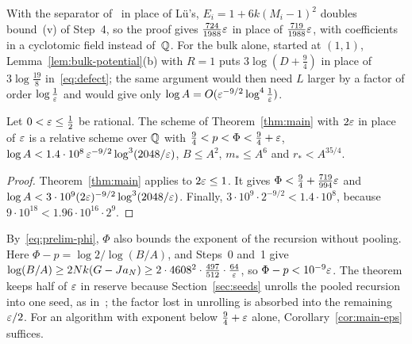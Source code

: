 With the separator of~\citep[Proposition~4.6]{FinCon26} in place of
Lü's, \(E_i=1+6k(M_i-1)^2\) doubles bound~(v) of Step~4, so the proof
gives \(\frac{724}{1988}\varepsilon\) in place of \(\frac{719}{1988}\varepsilon\),
with coefficients in a cyclotomic field instead of~\(\mathbb Q\). For the bulk
alone, started at \((1,1)\), Lemma~\ref{lem:bulk-potential}(b) with
\(R=1\) puts \(3\log(D+\frac94)\) in place of \(3\log\frac{19}8\)
in~\eqref{eq:defect}; the same argument would then need \(L\) larger by
a factor of order \(\log\frac1{\varepsilon}\) and would give only
\(\log A=O(\varepsilon^{-9/2}\log^4\frac1{\varepsilon})\).

\begin{corollary}\label{cor:main-eps}
Let \(0<\varepsilon\le\frac12\) be rational. The scheme of
Theorem~\ref{thm:main} with \(2\varepsilon\) in place of \(\varepsilon\) is a
relative scheme over \(\mathbb Q\) with \(\frac94<p<\Phi<\frac94+\varepsilon\),
\(\log A<1.4\cdot10^8\,\varepsilon^{-9/2}\log^3(2048/\varepsilon)\), \(B\le A^2\),
\(m_*\le A^6\) and \(r_*<A^{35/4}\).
\end{corollary}

\begin{proof}
Theorem~\ref{thm:main} applies to \(2\varepsilon\le1\). It gives
\(\Phi<\frac94+\frac{719}{994}\varepsilon\) and
\(\log A<3\cdot10^9(2\varepsilon)^{-9/2}\log^3(2048/\varepsilon)\). Finally,
\(3\cdot10^9\cdot2^{-9/2}<1.4\cdot10^8\), because
\(9\cdot10^{18}<1.96\cdot10^{16}\cdot2^9\).
\end{proof}

\begin{remark}
\label{rem:phi-p}
By~\eqref{eq:prelim-phi}, \(\Phi\) also bounds the exponent of the
recursion without pooling. Here \(\Phi-p=\log2/\log(B/A)\), and Steps~0
and~1 give
\(\log(B/A)\ge2Nk(G-Ja_N)\ge2\cdot4608^2\cdot\frac{497}{512}\cdot
\frac{64}{\varepsilon}\), so \(\Phi-p<10^{-9}\varepsilon\). The theorem keeps half of
\(\varepsilon\) in reserve because Section~\ref{sec:seeds} unrolls the pooled
recursion into one seed, as in~\citep[Theorem~9.2]{FinCon26}; the factor
lost in unrolling is absorbed into the remaining \(\varepsilon/2\). For an
algorithm with exponent below \(\frac94+\varepsilon\) alone,
Corollary~\ref{cor:main-eps} suffices.
\end{remark}
